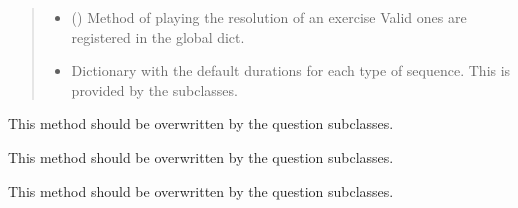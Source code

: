\documentclass[letterpaper,10pt,english]{sphinxmanual}
\begin{document}
\begin{fulllineitems}
\begin{fulllineitems}
\begin{quote}
\begin{description}
\begin{itemize}
\item {} 
\sphinxAtStartPar
{} () \textendash{} Method of playing the resolution of an
exercise Valid ones are registered in the
 global dict.

\item {} 
\sphinxAtStartPar
{} \textendash{} Dictionary with the default durations for
each type of sequence. This is provided by the subclasses.

\end{itemize}

\end{description}\end{quote}

\end{fulllineitems}


\begin{fulllineitems}
\label{\detokenize{birdears:birdears.questionbase.QuestionBase.check_question}}
\sphinxAtStartPar
This method should be overwritten by the question subclasses.

\end{fulllineitems}


\begin{fulllineitems}
\label{\detokenize{birdears:birdears.questionbase.QuestionBase.make_question}}
\sphinxAtStartPar
This method should be overwritten by the question subclasses.

\end{fulllineitems}


\begin{fulllineitems}
\label{\detokenize{birdears:birdears.questionbase.QuestionBase.make_resolution}}
\sphinxAtStartPar
This method should be overwritten by the question subclasses.


\end{fulllineitems}
\end{fulllineitems}
\end{document}
